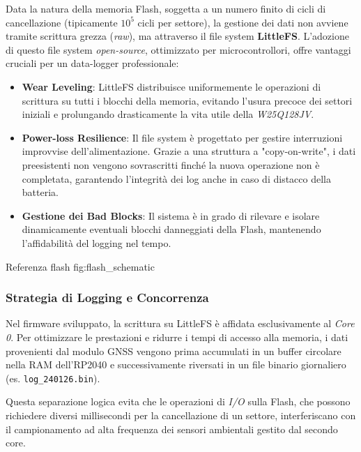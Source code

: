 Data la natura della memoria Flash, soggetta a un numero finito di cicli di cancellazione (tipicamente $10^5$ cicli per settore), la gestione dei dati non avviene tramite scrittura grezza (\textit{raw}), ma attraverso il file system \textbf{LittleFS}. L'adozione di questo file system \textit{open-source}, ottimizzato per microcontrollori, offre vantaggi cruciali per un data-logger professionale:

\begin{itemize}
    \item \textbf{Wear Leveling}: LittleFS distribuisce uniformemente le operazioni di scrittura su tutti i blocchi della memoria, evitando l'usura precoce dei settori iniziali e prolungando drasticamente la vita utile della \textit{W25Q128JV}.
    \item \textbf{Power-loss Resilience}: Il file system è progettato per gestire interruzioni improvvise dell'alimentazione. Grazie a una struttura a "copy-on-write", i dati preesistenti non vengono sovrascritti finché la nuova operazione non è completata, garantendo l'integrità dei log anche in caso di distacco della batteria.
    \item \textbf{Gestione dei Bad Blocks}: Il sistema è in grado di rilevare e isolare dinamicamente eventuali blocchi danneggiati della Flash, mantenendo l'affidabilità del logging nel tempo.
\end{itemize}

Referenza flash fig:flash_schematic

\subsubsection*{Strategia di Logging e Concorrenza}

Nel firmware sviluppato, la scrittura su LittleFS è affidata esclusivamente al \textit{Core 0}. Per ottimizzare le prestazioni e ridurre i tempi di accesso alla memoria, i dati provenienti dal modulo GNSS \cite{sam_m8q_ds} vengono prima accumulati in un buffer circolare nella RAM dell'RP2040 e successivamente riversati in un file binario giornaliero (es. \texttt{log\_240126.bin}).

Questa separazione logica evita che le operazioni di \textit{I/O} sulla Flash, che possono richiedere diversi millisecondi per la cancellazione di un settore, interferiscano con il campionamento ad alta frequenza dei sensori ambientali gestito dal secondo core.